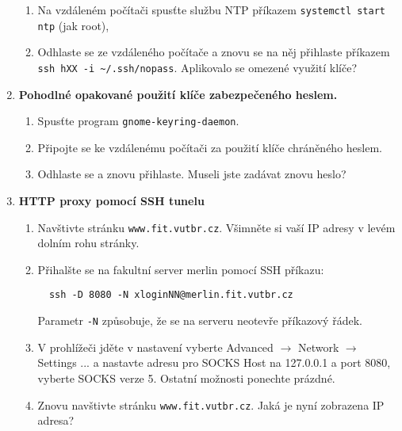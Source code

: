 \begin{enumerate}
\begin{enumerate}
      \item Na vzdáleném počítači spusťte službu NTP příkazem {\tt systemctl
        start ntp} (jak root),

      \item Odhlaste se ze vzdáleného počítače a znovu se na něj přihlaste
        příkazem {\tt ssh hXX -i \textasciitilde/.ssh/nopass}. Aplikovalo se
        omezené využití klíče?

    \end{enumerate}


  \item {\bf Pohodlné opakované použití klíče zabezpečeného heslem.}

    \begin{enumerate}

      \item Spusťte program {\tt gnome-keyring-daemon}.

      \item Připojte se ke vzdálenému počítači za použití klíče chráněného
        heslem.

      \item Odhlaste se a znovu přihlaste. Museli jste zadávat znovu heslo?

    \end{enumerate}

      \item {\bf HTTP proxy pomocí SSH tunelu}

    \begin{enumerate}

      \item Navštivte stránku {\tt www.fit.vutbr.cz}. Všimněte si vaší IP adresy v levém dolním rohu stránky.

      \item Přihalšte se na fakultní server merlin pomocí SSH příkazu:
\begin{verbatim}
  ssh -D 8080 -N xloginNN@merlin.fit.vutbr.cz
\end{verbatim}

        Parametr {\tt -N} způsobuje, že se na serveru neotevře příkazový řádek.

      \item V prohlížeči jděte v nastavení vyberte Advanced $\rightarrow$ Network $\rightarrow$
        Settings ... a nastavte adresu pro SOCKS
        Host na 127.0.0.1 a port 8080, vyberte SOCKS verze 5. Ostatní možnosti
        ponechte prázdné.

      \item Znovu navštivte stránku {\tt www.fit.vutbr.cz}. Jaká je nyní zobrazena IP adresa?

    \end{enumerate}

\end{enumerate}


